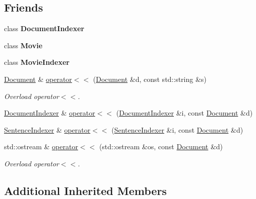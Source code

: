 \subsection*{Friends}
\begin{DoxyCompactItemize}
\item 
\mbox{\label{class_document_a449b7563be6606a689d4417c940b3b39}} 
class {\bfseries Document\+Indexer}
\item 
\mbox{\label{class_document_a6847efd2a0acea36866b464988df451a}} 
class {\bfseries Movie}
\item 
\mbox{\label{class_document_a0675564ad66cfa7f2eff3b44c1f1b2cc}} 
class {\bfseries Movie\+Indexer}
\item 
\hyperlink{class_document}{Document} \& \hyperlink{class_document_ab4b587c28bf3ed83ad2cb6e9052a5a58}{operator$<$$<$} (\hyperlink{class_document}{Document} \&d, const std\+::string \&s)
\begin{DoxyCompactList}\small\item\em Overload operator$<$$<$. \end{DoxyCompactList}\item 
\hyperlink{class_document_indexer}{Document\+Indexer} \& \hyperlink{class_document_a6c2e084b73080867237d1637bc040d66}{operator$<$$<$} (\hyperlink{class_document_indexer}{Document\+Indexer} \&i, const \hyperlink{class_document}{Document} \&d)
\item 
\hyperlink{class_sentence_indexer}{Sentence\+Indexer} \& \hyperlink{class_document_a30be5b0aa936deff7dc8763b554083ef}{operator$<$$<$} (\hyperlink{class_sentence_indexer}{Sentence\+Indexer} \&i, const \hyperlink{class_document}{Document} \&d)
\item 
std\+::ostream \& \hyperlink{class_document_aa87204fbda2f471a4c7a4499d97c8c27}{operator$<$$<$} (std\+::ostream \&os, const \hyperlink{class_document}{Document} \&d)
\begin{DoxyCompactList}\small\item\em Overload operator$<$$<$. \end{DoxyCompactList}\end{DoxyCompactItemize}
\subsection*{Additional Inherited Members}


